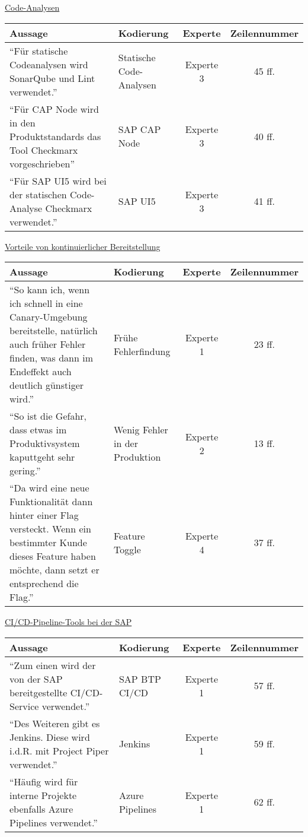     \underline{Code-Analysen}\\
\begin{longtable}{ |C{6cm}|C{3cm}|c|c| }
    \hline
    Aussage & Kodierung & Experte & Zeilennummer\\
    \hline
    \enquote{Für statische Codeanalysen wird SonarQube und Lint verwendet.} & Statische Code-Analysen & Experte 3 & 45 ff. \\
    \hline
    \enquote{Für CAP Node wird in den Produktstandards das Tool Checkmarx vorgeschrieben} & SAP CAP Node  & Experte 3 & 40 ff. \\
    \hline
    \enquote{Für SAP UI5 wird bei der statischen Code-Analyse Checkmarx verwendet.} & SAP UI5  & Experte 3 & 41 ff. \\
    \hline
    \end{longtable}
\newpage
    \underline{Vorteile von kontinuierlicher Bereitstellung}\\
    \begin{longtable}{ |C{6cm}|C{3cm}|c|c| }
        \hline
        Aussage & Kodierung & Experte & Zeilennummer\\
        \hline
        \enquote{So kann ich, wenn ich schnell in eine Canary-Umgebung bereitstelle, natürlich auch früher Fehler finden, was dann im Endeffekt auch deutlich günstiger wird.} & Frühe Fehlerfindung & Experte 1 & 23 ff. \\
        \hline
        \enquote{So ist die Gefahr, dass etwas im Produktivsystem kaputtgeht sehr gering.} & Wenig Fehler in der Produktion & Experte 2 & 13 ff. \\
        \hline
        \enquote{Da wird eine neue Funktionalität dann hinter einer Flag versteckt. Wenn ein bestimmter Kunde dieses Feature haben möchte, dann setzt er entsprechend die Flag.} & Feature Toggle & Experte 4 & 37 ff. \\
        \hline
        \end{longtable}




    \underline{CI/CD-Pipeline-Tools bei der SAP}\\
\begin{longtable}{ |C{6cm}|C{3cm}|c|c| }
    \hline
    Aussage & Kodierung & Experte & Zeilennummer\\
    \hline
    \enquote{Zum einen wird der von der SAP bereitgestellte CI/CD-Service verwendet.} & SAP BTP CI/CD & Experte 1 & 57 ff. \\
    \hline
    \enquote{Des Weiteren gibt es Jenkins. Diese wird i.d.R. mit Project Piper verwendet.} & Jenkins & Experte 1 & 59 ff. \\
    \hline
    \enquote{Häufig wird für interne Projekte ebenfalls Azure Pipelines verwendet.} & Azure Pipelines & Experte 1 & 62 ff. \\
    \hline
    \end{longtable}

